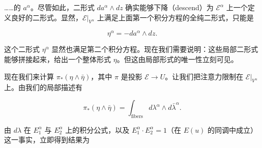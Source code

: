 

……的 $a^\alpha$。尽管如此，二形式 $da^\alpha\wedge dz$ 确实能够下降（descend）为 $\mathcal{E}^\alpha$ 上一个定义良好的二形式。显然，$\mathcal{E}|_{V^\alpha}$ 上满足上面第一个积分方程的全纯二形式，只能是

\[
  \eta^\alpha = -da^\alpha\wedge dz .
\]


这个二形式 $\eta^\alpha$ 显然也满足第二个积分方程。现在我们需要说明：这些局部二形式能够拼接起来，给出一个整体形式 $\eta$。但这由局部形式的唯一性立刻可见。

现在我们来计算 $\pi_*(\eta\wedge\bar\eta)$，其中 $\pi$ 是投影 $\mathcal{E}\to U$。让我们把注意力限制在 $\mathcal{E}|_{V^\alpha}$ 上。由我们的局部描述有

\[
  \pi_*(\eta\wedge\bar\eta)=\int_{\text{fibers}}d\lambda^\alpha\wedge d\bar\lambda^\alpha .
\]

由 $d\lambda$ 在 $E_1^\alpha$ 与 $E_2^\alpha$ 上的积分公式，以及 $E_1^\alpha\cdot E_2^\alpha=1$（在 $E(u)$ 的同调中成立）这一事实，立即得到结果为

